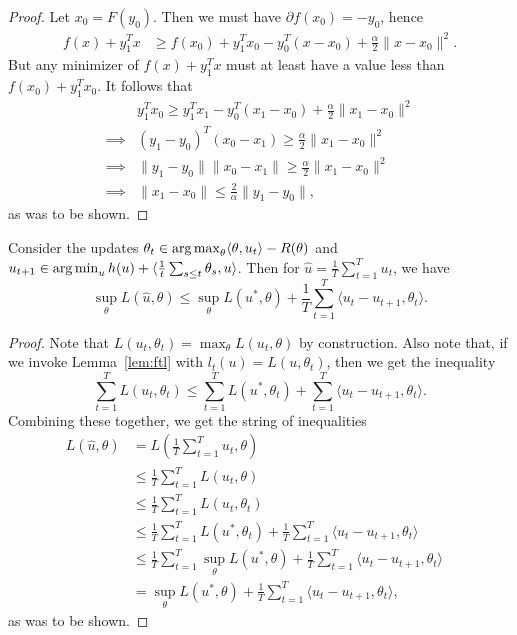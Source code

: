\documentclass{article}
\begin{document}
\begin{proof}
Let $x_0 = F(y_0)$. Then we must have $\partial f(x_0) = -y_0$, hence 
\begin{align*}
f(x)+y_1^Tx &\geq f(x_0) + y_1^Tx_0 - y_0^T(x-x_0) + \frac{\alpha}{2}\|x-x_0\|^2.
\end{align*}
But any minimizer of $f(x) + y_1^Tx$ must at least have a value less than $f(x_0) + y_1^Tx_0$. 
It follows that 
\begin{align*}
         & y_1^Tx_0 \geq y_1^Tx_1 - y_0^T(x_1-x_0) + \frac{\alpha}{2}\|x_1-x_0\|^2 \\
\implies & (y_1-y_0)^T(x_0-x_1) \geq \frac{\alpha}{2}\|x_1-x_0\|^2 \\
\implies & \|y_1-y_0\|\|x_0-x_1\| \geq \frac{\alpha}{2}\|x_1-x_0\|^2 \\
\implies & \|x_1-x_0\| \leq \frac{2}{\alpha} \|y_1-y_0\|,
\end{align*}
as was to be shown.
\end{proof}
\begin{proposition}
Consider the updates $\theta_t \in \argmax_{\theta} \langle \theta, u_t \rangle - R(\theta)$ 
and $u_{t+1} \in \argmin_u h(u) + \langle \frac{1}{t} \sum_{s \leq t} \theta_s, u \rangle$. 
Then for $\hat{u} = \frac{1}{T} \sum_{t=1}^T u_t$, we have
\[ \sup_{\theta} L(\hat{u}, \theta) \leq \sup_{\theta} L(u^*, \theta) + \frac{1}{T} \sum_{t=1}^T \langle u_t - u_{t+1}, \theta_t \rangle. \]
\end{proposition}
\begin{proof} 
Note that $L(u_t, \theta_t) = \max_{\theta} L(u_t, \theta)$ by construction. Also note that, if we invoke 
Lemma~\ref{lem:ftl} with $l_t(u) = L(u, \theta_t)$, then we get the inequality
\[ \sum_{t=1}^T L(u_t, \theta_t) \leq \sum_{t=1}^T L(u^*, \theta_t) + \sum_{t=1}^T \langle u_t - u_{t+1}, \theta_t \rangle. \]
Combining these together, we get the string of inequalities 
\begin{align*}
L(\hat{u}, \theta) &= L\left(\frac{1}{T} \sum_{t=1}^T u_t, \theta\right) \\
 &\leq \frac{1}{T} \sum_{t=1}^T L(u_t, \theta) & \\
 &\leq \frac{1}{T} \sum_{t=1}^T L(u_t, \theta_t) \\
 &\leq \frac{1}{T} \sum_{t=1}^T L(u^*, \theta_t) + \frac{1}{T} \sum_{t=1}^T \langle u_t - u_{t+1}, \theta_t \rangle \\
 &\leq \frac{1}{T} \sum_{t=1}^T \sup_{\theta} L(u^*, \theta) + \frac{1}{T} \sum_{t=1}^T \langle u_t - u_{t+1}, \theta_t \rangle \\
 &= \sup_{\theta} L(u^*, \theta) + \frac{1}{T} \sum_{t=1}^T \langle u_t - u_{t+1}, \theta_t \rangle,
\end{align*}
as was to be shown.
\end{proof}
\end{document}
